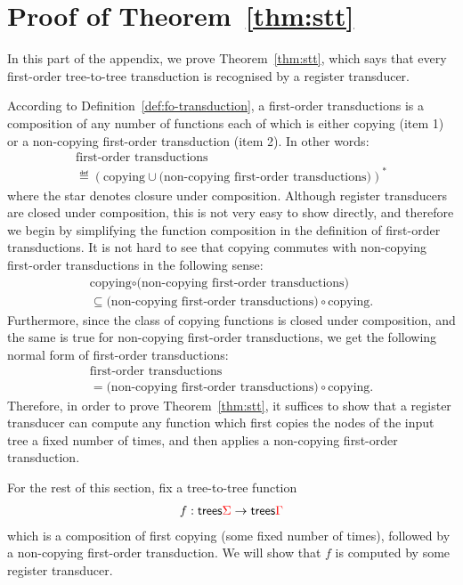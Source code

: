 \section{Proof of Theorem~\ref{thm:stt}}
\label{sec:stt-appendix}
In this part of the appendix, we prove Theorem~\ref{thm:stt}, which says that every first-order tree-to-tree transduction is recognised by a register transducer. 

According to Definition~\ref{def:fo-transduction}, a first-order transductions is a composition of any number of functions each of which is either  copying (item 1) or a non-copying first-order transduction (item 2). In other words:
$$\begin{array}{c}
\text{first-order transductions} \\ \eqdef (\text{copying} \cup \text{(non-copying first-order transductions)})^*
\end{array}$$
where the star denotes closure under composition. Although register transducers are closed under composition, this is not very   easy to show directly, and therefore we begin by simplifying the function composition in the definition of first-order transductions.  It is not hard to see that copying commutes with non-copying first-order transductions in the following sense:
\begin{align*}
    \text{copying} \circ  \text{(non-copying first-order transductions)}  \\ \subseteq   \text{(non-copying first-order transductions)} \circ \text{copying}.
    \end{align*}
Furthermore, since the class of copying functions is closed under composition, and the same is true for non-copying first-order transductions, we get the following normal form of first-order transductions:
$$\begin{array}{c}
    \text{first-order transductions} \\=  \text{(non-copying first-order transductions)} \circ \text{copying}.
    \end{array}$$
Therefore, in order to prove Theorem~\ref{thm:stt}, it suffices to show that a register transducer can compute any function which first copies the nodes of the input tree a fixed number of times, and then applies a non-copying first-order transduction. 

For the rest of this section, fix  a tree-to-tree function
\begin{align*}
f : \mathsf {trees} {\color{red}{\Sigma}} \to \mathsf {trees} {\color{red}{\Gamma}}
\end{align*}
which is a composition of first copying (some fixed number of times), followed by a non-copying first-order transduction. We will show that $f$ is computed by some register transducer.  


